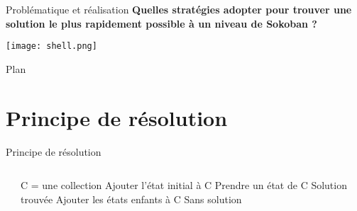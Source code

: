     \begin{frame}{Problématique et réalisation}
        \centering
        \Large\textbf{Quelles stratégies adopter pour trouver une solution le plus rapidement possible à un niveau de Sokoban ?}

        \vspace{1.5cm} %
        \texttt{[image: shell.png]}
     \end{frame}

    \begin{frame}{Plan}
        \tableofcontents%
    \end{frame}

    \section{Principe de résolution}
        \begin{frame}{Principe de résolution}
            \begin{columns}
                \begin{column}{\paperwidth}
                    
                \end{column}

                \begin{column}{\paperwidth}
                    \begin{minipage}{\textwidth}
                        \begin{algorithmic}[1]
                            \State C = une collection
                            \State Ajouter l'état initial à C
                                \State Prendre un état de C
                                    \State Solution trouvée
                                \EndIf
                                \State Ajouter les états enfants à C
                            \EndWhile
                            \State Sans solution
                        \end{algorithmic}
                    \end{minipage}
                \end{column}
            \end{columns}
        \end{frame}

